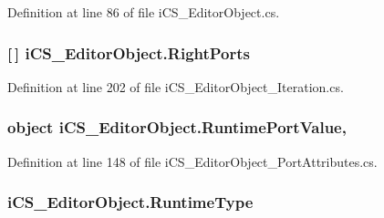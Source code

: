 Definition at line 86 of file i\+C\+S\+\_\+\+Editor\+Object.\+cs.

\hypertarget{classi_c_s___editor_object_afe1cc4185bd4780986ba9375843b7efb}{
\subsubsection[{Right\+Ports}]{ \mbox{[}$\,$\mbox{]} i\+C\+S\+\_\+\+Editor\+Object.\+Right\+Ports\hspace{0.3cm}{\ttfamily [get]}}}\label{classi_c_s___editor_object_afe1cc4185bd4780986ba9375843b7efb}


Definition at line 202 of file i\+C\+S\+\_\+\+Editor\+Object\+\_\+\+Iteration.\+cs.

\hypertarget{classi_c_s___editor_object_a8e635f2e584ad68ca5804a328808d70f}{
\subsubsection[{Runtime\+Port\+Value}]{\setlength{\rightskip}{0pt plus 5cm}object i\+C\+S\+\_\+\+Editor\+Object.\+Runtime\+Port\+Value\hspace{0.3cm}{\ttfamily [get]}, {\ttfamily [set]}}}\label{classi_c_s___editor_object_a8e635f2e584ad68ca5804a328808d70f}


Definition at line 148 of file i\+C\+S\+\_\+\+Editor\+Object\+\_\+\+Port\+Attributes.\+cs.

\hypertarget{classi_c_s___editor_object_a81ad56a019122d21c1fa600cd20cff80}{
\subsubsection[{Runtime\+Type}]{ i\+C\+S\+\_\+\+Editor\+Object.\+Runtime\+Type\hspace{0.3cm}{\ttfamily [get]}}}\label{classi_c_s___editor_object_a81ad56a019122d21c1fa600cd20cff80}


